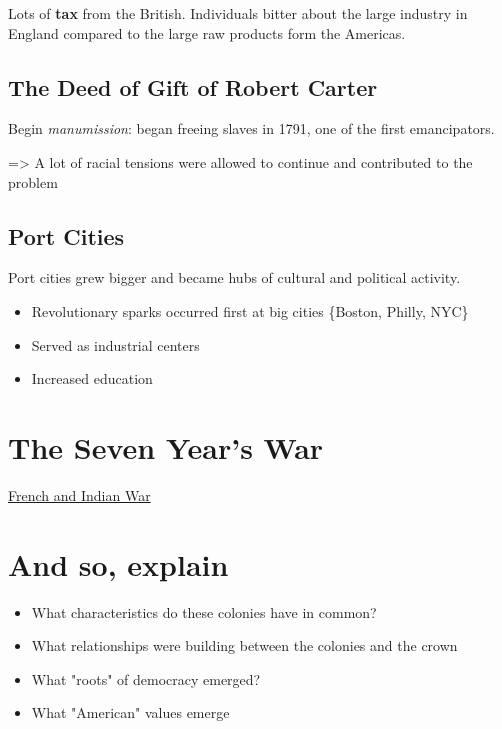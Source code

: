 \documentclass[letterpaper]{article}
\begin{document}
Lots of \textbf{\textbf{tax}} from the British. Individuals bitter about the large industry in England compared to the large raw products form the Americas.

\subsection{The Deed of Gift of Robert Carter}
\label{sec:org038cfc0}
Begin \emph{manumission}: began freeing slaves in 1791, one of the first emancipators.

=> A lot of racial tensions were allowed to continue and contributed to the problem

\subsection{Port Cities}
\label{sec:org08d50fe}
Port cities grew bigger and became hubs of cultural and political activity.

\begin{itemize}
\item Revolutionary sparks occurred first at big cities \{Boston, Philly, NYC\}
\item Served as industrial centers
\item Increased education
\end{itemize}


\section{The Seven Year's War}
\label{sec:org6c6c12e}
\href{KBhFrenchAndIndian.org}{French and Indian War}

\section{And so, explain}
\label{sec:org730bf4b}
\begin{itemize}
\item What characteristics do these colonies have in common?
\item What relationships were building between the colonies and the crown
\item What "roots" of democracy emerged?
\item What "American" values emerge
\end{itemize}
\end{document}
